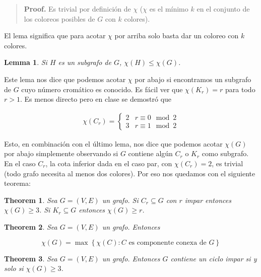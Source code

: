 \documentclass[a4paper]{article}
\newtheorem{lemma}{Lemma}
\newtheorem{theorem}{Theorem}
\newtheorem{lemma}{Lemma}
\newtheorem{theorem}{Theorem}
\begin{document}
\small
\begin{quote}

\textbf{Proof.} Es trivial por definición de $\chi$ ($\chi$ es el mínimo $k$ en
el conjunto de los coloreos posibles de $G$ con $k$ colores).

\end{quote}
\normalsize

El lema significa que para acotar $\chi$ por arriba solo basta dar un coloreo
con $k$ colores.

\begin{lemma}
    Si $H$ es un subgrafo de $G$, $\chi(H) \leq \chi(G)$.
\end{lemma}

Este lema nos dice que podemos acotar $\chi$ por abajo si encontramos un
subgrafo de $G$ cuyo número cromático es conocido. Es fácil ver que $\chi(K_r) =
r$ para todo $r > 1$. Es menos directo pero en clase se demostró que

\begin{align*}
    \chi(C_r) = \begin{cases}
        2 & r \equiv 0 \mod 2  \\ 
        3 & r \equiv 1 \mod 2 
    \end{cases}
\end{align*}

Esto, en combinación con el último lema, nos dice que podemos acotar $\chi(G)$
por abajo simplemente observando si $G$ contiene algún $C_r$  o $K_r$ como
subgrafo. En el caso $C_r$, la cota inferior dada en el caso par, con $\chi(C_r)
= 2$, es trivial (todo grafo necesita al menos dos colores). Por eso nos
quedamos con el siguiente teorema: 

\begin{theorem}
    Sea $G = (V, E) $ un grafo. Si $C_r \subseteq G$ con $r$ impar entonces
    $\chi(G) \geq 3$. Si $K_r \subseteq G$ entonces $\chi(G) \geq r$.
\end{theorem}

\begin{theorem}
    
    Sea $G = (V, E) $ un grafo. Entonces 

    $$\chi(G) = \max \left\{ \chi(C) : C \text{ es componente
conexa de  } G \right\} $$

\end{theorem}


\begin{theorem}
    Sea $G = (V, E) $ un grafo. Entonces $G$ contiene un ciclo impar si y solo
    si $\chi(G) \geq 3$.
\end{theorem}
\end{document}
